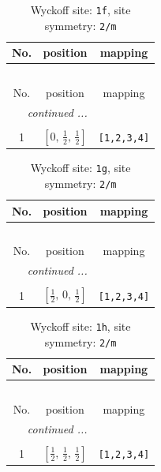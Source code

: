 \documentclass[fleqn,8pt]{jsarticle}
\begin{document}
\renewcommand{\arraystretch}{1.2}
\begin{longtable}{ccc}
\caption{Wyckoff site: {\tt 1f}, site symmetry: {\tt 2/m}}
 \\
 \hline \hline
No. & position & mapping \\ \hline \endfirsthead

\multicolumn{2}{l}{\tablename\ \thetable{}} \\
 \hline \hline
No. & position & mapping \\ \hline \endhead

 \hline \hline
\multicolumn{2}{r}{\footnotesize\it continued ...} \\ \endfoot

 \hline \hline
\multicolumn{2}{r}{} \\ \endlastfoot

1 & $\left[ 0,\, \frac{1}{2},\, \frac{1}{2} \right]$ & {\tt [1,2,3,4]} \\
\end{longtable}
\renewcommand{\arraystretch}{1.2}
\begin{longtable}{ccc}
\caption{Wyckoff site: {\tt 1g}, site symmetry: {\tt 2/m}}
 \\
 \hline \hline
No. & position & mapping \\ \hline \endfirsthead

\multicolumn{2}{l}{\tablename\ \thetable{}} \\
 \hline \hline
No. & position & mapping \\ \hline \endhead

 \hline \hline
\multicolumn{2}{r}{\footnotesize\it continued ...} \\ \endfoot

 \hline \hline
\multicolumn{2}{r}{} \\ \endlastfoot

1 & $\left[ \frac{1}{2},\, 0,\, \frac{1}{2} \right]$ & {\tt [1,2,3,4]} \\
\end{longtable}
\renewcommand{\arraystretch}{1.2}
\begin{longtable}{ccc}
\caption{Wyckoff site: {\tt 1h}, site symmetry: {\tt 2/m}}
 \\
 \hline \hline
No. & position & mapping \\ \hline \endfirsthead

\multicolumn{2}{l}{\tablename\ \thetable{}} \\
 \hline \hline
No. & position & mapping \\ \hline \endhead

 \hline \hline
\multicolumn{2}{r}{\footnotesize\it continued ...} \\ \endfoot

 \hline \hline
\multicolumn{2}{r}{} \\ \endlastfoot

1 & $\left[ \frac{1}{2},\, \frac{1}{2},\, \frac{1}{2} \right]$ & {\tt [1,2,3,4]} \\
\end{longtable}
\end{document}
